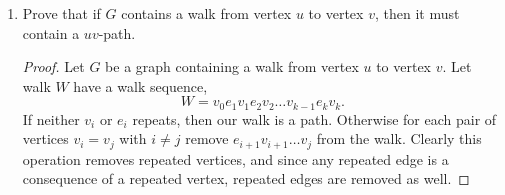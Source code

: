 \documentclass[12pt]{article}
\begin{document}
\begin{enumerate}
	\item Prove that if $G$ contains a walk from vertex $u$ to vertex $v$, then it must contain a $uv$-path. 
	\begin{proof} Let $G$ be a graph containing a walk from vertex $u$ to vertex $v$. 
		Let walk $W$ have a walk sequence, 
		\begin{equation*}
			W = v_0e_1v_1e_2v_2\dots v_{k - 1}e_kv_k.
		\end{equation*}
		If neither $v_i$ or $e_i$ repeats, then our walk is a path. Otherwise for each pair of vertices $v_i = v_j$ with $i \neq j$ remove $e_{i + 1}v_{i+1}\dots v_j$ from the walk. 
		Clearly this operation removes repeated vertices, and since any repeated edge is a consequence of a repeated vertex, repeated edges are removed as well. 
  	\end{proof}
	\newpage


\end{enumerate}
\end{document}
